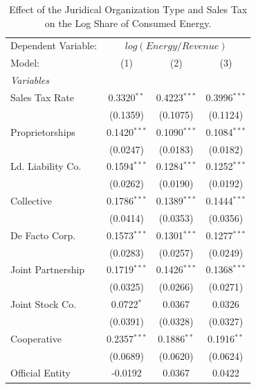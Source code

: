 \documentclass[
  12pt]{article}
\theoremstyle{definition}
\theoremstyle{remark}
\begin{document}
\begin{table}

\caption{\label{tbl-reg-energy}Effect of the Juridical Organization Type
and Sales Tax on the Log Share of Consumed Energy.}

\begin{minipage}{\linewidth}

\begingroup
\centering
\begin{tabular}{lccc}
   \tabularnewline \midrule \midrule
   Dependent Variable: & \multicolumn{3}{c}{\(log(Energy/Revenue)\)}\\
   Model:            & (1)            & (2)            & (3)\\  
   \midrule
   \emph{Variables}\\
   Sales Tax Rate    & 0.3320$^{**}$  & 0.4223$^{***}$ & 0.3996$^{***}$\\   
                     & (0.1359)       & (0.1075)       & (0.1124)\\   
   Proprietorships   & 0.1420$^{***}$ & 0.1090$^{***}$ & 0.1084$^{***}$\\   
                     & (0.0247)       & (0.0183)       & (0.0182)\\   
   Ld. Liability Co. & 0.1594$^{***}$ & 0.1284$^{***}$ & 0.1252$^{***}$\\   
                     & (0.0262)       & (0.0190)       & (0.0192)\\   
   Collective        & 0.1786$^{***}$ & 0.1389$^{***}$ & 0.1444$^{***}$\\   
                     & (0.0414)       & (0.0353)       & (0.0356)\\   
   De Facto Corp.    & 0.1573$^{***}$ & 0.1301$^{***}$ & 0.1277$^{***}$\\   
                     & (0.0283)       & (0.0257)       & (0.0249)\\   
   Joint Partnership & 0.1719$^{***}$ & 0.1426$^{***}$ & 0.1368$^{***}$\\   
                     & (0.0325)       & (0.0266)       & (0.0271)\\   
   Joint Stock Co.   & 0.0722$^{*}$   & 0.0367         & 0.0326\\   
                     & (0.0391)       & (0.0328)       & (0.0327)\\   
   Cooperative       & 0.2357$^{***}$ & 0.1886$^{**}$  & 0.1916$^{**}$\\   
                     & (0.0689)       & (0.0620)       & (0.0624)\\   
   Official Entity   & -0.0192        & 0.0367         & 0.0422\\   

\end{tabular}
\end{minipage}
\end{table}
\end{document}
